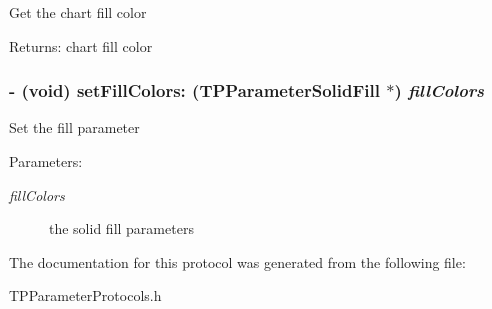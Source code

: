 Get the chart fill color \begin{Desc}
\item[Returns:]chart fill color \end{Desc}
\hypertarget{protocol_t_p_chart_solid_fill-p_6e76d20ece19c4a545c530ae19cf39c7}{
\subsubsection[{setFillColors:}]{\setlength{\rightskip}{0pt plus 5cm}- (void) setFillColors: ({\bf TPParameterSolidFill} $\ast$) {\em fillColors}}}
\label{protocol_t_p_chart_solid_fill-p_6e76d20ece19c4a545c530ae19cf39c7}


Set the fill parameter \begin{Desc}
\item[Parameters:]
\begin{description}
\item[{\em fillColors}]the solid fill parameters \end{description}
\end{Desc}


The documentation for this protocol was generated from the following file:\begin{CompactItemize}
\item 
TPParameterProtocols.h\end{CompactItemize}
